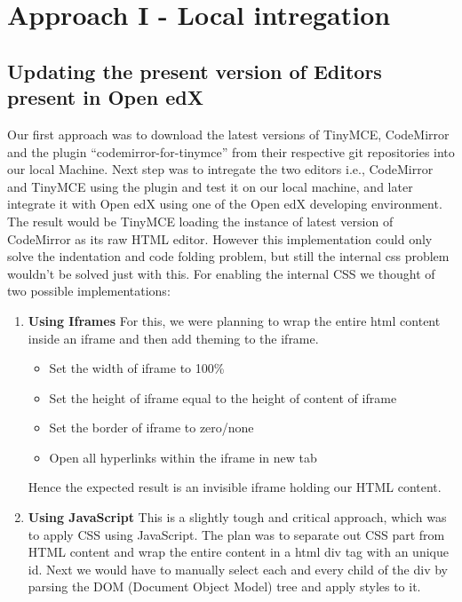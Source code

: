 
\chapter{Approach I - Local intregation}
\section{Updating the present version of Editors present in Open edX}
Our first approach was to download the latest versions of TinyMCE, CodeMirror and
the plugin “codemirror-for-tinymce” from their respective git repositories into our local
Machine.\newline
Next step was to intregate the two editors i.e., CodeMirror and TinyMCE using the plugin and
test it on our local machine, and later integrate it with Open edX using one of the Open edX developing
environment.\newline
The result would be TinyMCE loading the instance of latest version of CodeMirror as its
raw HTML editor.
However this implementation could only solve the indentation and code folding problem,
but still the internal css problem wouldn’t be solved just with this.\newline\newline
For enabling the internal CSS we thought of two possible implementations:
\begin{enumerate}
\item\textbf{Using Iframes}\newline
For this, we were planning to wrap the entire html content inside an iframe
and then add theming to the iframe.
\begin{itemize}
\item Set the width of iframe to 100\%
\item Set the height of iframe equal to the height of content of iframe
\item Set the border of iframe to zero/none
\item Open all hyperlinks within the iframe in new tab
\end{itemize}
Hence the expected result is an invisible iframe holding our HTML content.



\item\textbf{Using JavaScript}\newline
This is a slightly tough and critical approach, which was to apply CSS using
JavaScript. The plan was to separate out CSS part from HTML content and
wrap the entire content in a html div tag with an unique id.
Next we would have to manually select each and every child of the div by
parsing the DOM (Document Object Model) tree and apply styles to it.\newline
\end{enumerate}

